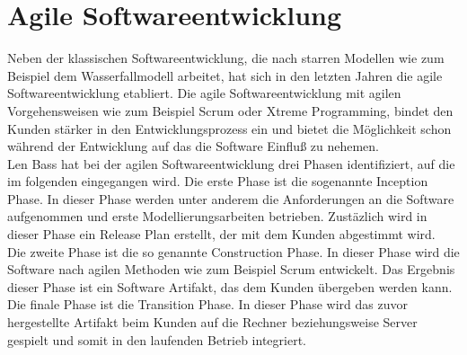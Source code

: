\section{Agile Softwareentwicklung}
Neben der klassischen Softwareentwicklung, die nach starren Modellen wie zum Beispiel dem Wasserfallmodell arbeitet, hat sich in den letzten Jahren die agile Softwareentwicklung etabliert. Die agile Softwareentwicklung mit agilen Vorgehensweisen wie zum Beispiel Scrum oder Xtreme Programming, bindet den Kunden stärker in den Entwicklungsprozess ein und bietet die Möglichkeit schon während der Entwicklung auf das die Software Einfluß zu nehemen. \\
Len Bass hat bei der agilen Softwareentwicklung drei Phasen identifiziert, auf die im folgenden eingegangen wird. Die erste Phase ist die sogenannte Inception Phase. In dieser Phase werden unter anderem die Anforderungen an die Software aufgenommen und erste Modellierungsarbeiten betrieben. Zustäzlich wird in dieser Phase ein Release Plan erstellt, der mit dem Kunden abgestimmt wird.\\
Die zweite Phase ist die so genannte Construction Phase. In dieser Phase wird die Software nach agilen Methoden wie zum Beispiel Scrum entwickelt. Das Ergebnis dieser Phase ist ein Software Artifakt, das dem Kunden übergeben werden kann. \\
Die finale Phase ist die Transition Phase. In dieser Phase wird das zuvor hergestellte Artifakt beim Kunden auf die Rechner beziehungsweise Server gespielt und somit in den laufenden Betrieb integriert.

